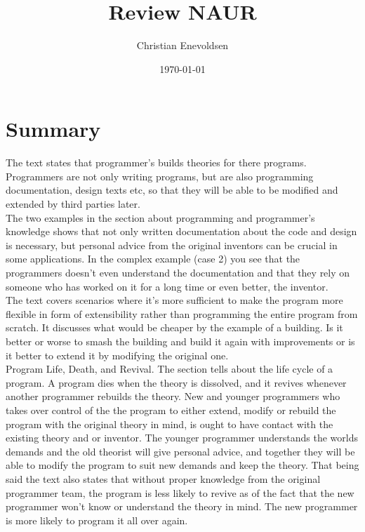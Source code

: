 \documentclass[]{article}
\begin{document}
\title{Review NAUR}
\author{Christian Enevoldsen}
\date{\today}
\maketitle

\section*{Summary}

The text states that programmer's builds theories for there programs. Programmers are not only writing programs, but are also programming documentation, design texts etc, so that they will be able to be modified and extended by third parties later.\\

The two examples in the section about programming and programmer's knowledge shows that not only written documentation about the code and design is necessary, but personal advice from the original inventors can be crucial in some applications. In the complex example (case 2) you see that the programmers doesn't even understand the documentation and that they rely on someone who has worked on it for a long time or even better, the inventor. \\

The text covers scenarios where it's more sufficient to make the program more flexible in form of extensibility rather than programming the entire program from scratch. It discusses what would be cheaper by the example of a building. Is it better or worse to smash the building and build it again with improvements or is it better to extend it by modifying the original one. \\

Program Life, Death, and Revival. The section tells about the life cycle of  a program. A program dies when the theory is dissolved, and it revives whenever another programmer rebuilds the theory. New and younger programmers who takes over control of the the program to either extend, modify or rebuild the program with the original theory in mind, is ought to have contact with the existing theory and or inventor. The younger programmer understands the worlds demands and the old theorist will give personal advice, and together they will be able to modify the program to suit new demands and keep the theory. That being said the text also states that without proper knowledge from the original programmer team, the program is less likely to revive as of the fact that the new programmer won't know or understand the theory in mind. The new programmer is more likely to program it all over again. \\
\end{document}
